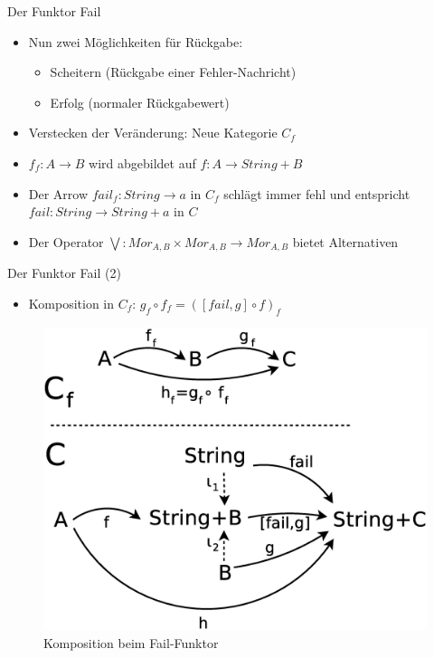 \documentclass{beamer}
\begin{document}
\begin{frame}{Der Funktor Fail}
  \begin{itemize}
  \item Nun zwei Möglichkeiten für Rückgabe:
    \begin{itemize}
    \item Scheitern (Rückgabe einer Fehler-Nachricht)
    \item Erfolg (normaler Rückgabewert)
    \end{itemize}
  \item Verstecken der Veränderung: Neue Kategorie $C_{f}$
  \item $f_{f} : A \rightarrow B$ wird abgebildet auf
    $f : A \rightarrow String + B$
  \item Der Arrow $fail_{f} : String \rightarrow a$ in $C_{f}$ schlägt immer
    fehl und entspricht $fail : String \rightarrow String + a$ in $C$
  \item Der Operator $\bigvee : Mor_{A,B} \times Mor_{A,B} \rightarrow
    Mor_{A,B} $ bietet Alternativen
  \end{itemize}
\end{frame}

\begin{frame}{Der Funktor Fail (2)}
  \begin{itemize}
  \item Komposition in $C_{f}$:  $g_{f} \circ f_{f} = ([fail,g] \circ f)_{f}$ 
  \end{itemize}
  \begin{figure}
    \centering
    \includegraphics[scale=0.3]{images/cat_fail}
    \caption{Komposition beim Fail-Funktor}
  \end{figure}
\end{frame}
\end{document}
